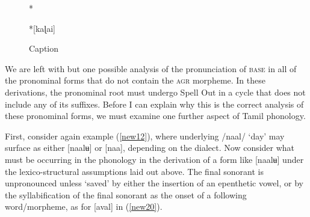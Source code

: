 \documentclass[output=paper,colorlinks,citecolor=brown,
]{langscibook}
\begin{document}
\begin{figure}
    \centering
    \begin{minipage}[t][][t]{.1\textwidth}
        *
    \end{minipage}
    \begin{minipage}[t]{.45\textwidth}
    \end{minipage}
    \begin{minipage}[t][][c]{.1\textwidth}
        \rightarrow 
    \end{minipage}
    \begin{minipage}[t]{.2\textwidth}
        *[kaɭai]
    \end{minipage}
    \caption{Caption}
    \label{new19}
\end{figure}

We are left with but one possible analysis of the pronunciation of \textsc{base} in all of the pronominal forms that do not contain the \textsc{agr} morpheme. In these derivations, the pronominal root must undergo Spell Out in a cycle that does not include any of its suffixes. Before I can explain why this is the correct analysis of these pronominal forms, we must examine one further aspect of Tamil phonology. 

First, consider again example (\ref{new12}), where underlying /naal/ ‘day’ may surface as either  [naalʉ] or [naa], depending on the dialect. Now consider what must be occurring in the phonology in the derivation of a form like [naalʉ] under the lexico-structural assumptions laid out above. The final sonorant is unpronounced unless ‘saved’ by either the insertion of an epenthetic vowel, or by the syllabification of the final sonorant as the onset of a following word/morpheme, as for [aval] in (\ref{new20}).
\end{document}

